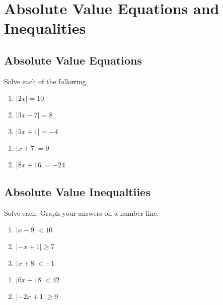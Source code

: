 \chapter{Absolute Value Equations and Inequalities}

\section{Absolute Value Equations}

Solve each of the following.

\begin{multicols}{3}
\begin{enumerate}
	\item $|2x| = 10$
	\item $|3x-7|=8$
	\item $|5x+1| = -4$
\end{enumerate}	\setcounter{Review}{\value{enumi}}
\end{multicols}
\begin{multicols}{3}
\begin{enumerate}	\setcounter{enumi}{\value{Review}}
	\item $|x + 7| = 9$
	\item $|8x+16| = -24$
\end{enumerate}	\setcounter{Review}{\value{enumi}}
\end{multicols}



\section{Absolute Value Inequaltiies}

Solve each. Graph your answers on a number line.

\begin{multicols}{3}
\begin{enumerate}
	\item $|x-9| < 10$
	\item $|-x+1| \geq 7$
	\item $|x+8| < -1$
\end{enumerate}	\setcounter{Review}{\value{enumi}}
\end{multicols}
\begin{multicols}{3}
\begin{enumerate}	\setcounter{enumi}{\value{Review}}
	\item $|6x - 18| < 42$
	\item $|-2x+1| \geq 9$
\end{enumerate}	\setcounter{Review}{\value{enumi}}
\end{multicols}




